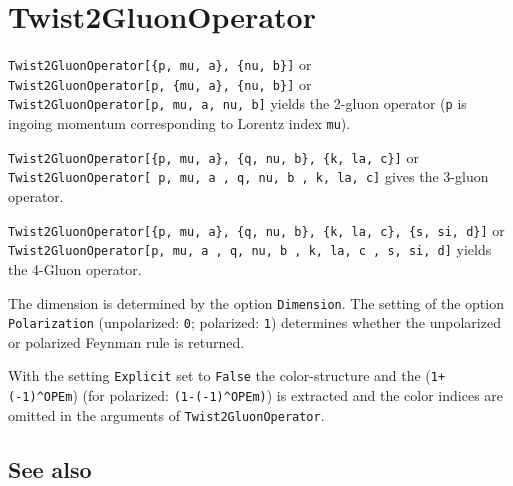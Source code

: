 \documentclass[../FeynCalcManual.tex]{subfiles}
\begin{document}
\hypertarget{twist2gluonoperator}{%
\section{Twist2GluonOperator}\label{twist2gluonoperator}}

\texttt{Twist2GluonOperator[\allowbreak{}\{\allowbreak{}p,\ \allowbreak{}mu,\ \allowbreak{}a\},\ \allowbreak{}\{\allowbreak{}nu,\ \allowbreak{}b\}]}
or
\texttt{Twist2GluonOperator[\allowbreak{}p,\ \allowbreak{}\{\allowbreak{}mu,\ \allowbreak{}a\},\ \allowbreak{}\{\allowbreak{}nu,\ \allowbreak{}b\}]}
or
\texttt{Twist2GluonOperator[\allowbreak{}p,\ \allowbreak{}mu,\ \allowbreak{}a,\ \allowbreak{}nu,\ \allowbreak{}b]}
yields the 2-gluon operator (\texttt{p} is ingoing momentum
corresponding to Lorentz index \texttt{mu}).

\texttt{Twist2GluonOperator[\allowbreak{}\{\allowbreak{}p,\ \allowbreak{}mu,\ \allowbreak{}a\},\ \allowbreak{}\{\allowbreak{}q,\ \allowbreak{}nu,\ \allowbreak{}b\},\ \allowbreak{}\{\allowbreak{}k,\ \allowbreak{}la,\ \allowbreak{}c\}]}
or
\texttt{Twist2GluonOperator[\allowbreak{} p,\ \allowbreak{}mu,\ \allowbreak{}a ,\ \allowbreak{}q,\ \allowbreak{}nu,\ \allowbreak{}b ,\ \allowbreak{}k,\ \allowbreak{}la,\ \allowbreak{}c]}
gives the 3-gluon operator.

\texttt{Twist2GluonOperator[\allowbreak{}\{\allowbreak{}p,\ \allowbreak{}mu,\ \allowbreak{}a\},\ \allowbreak{}\{\allowbreak{}q,\ \allowbreak{}nu,\ \allowbreak{}b\},\ \allowbreak{}\{\allowbreak{}k,\ \allowbreak{}la,\ \allowbreak{}c\},\ \allowbreak{}\{\allowbreak{}s,\ \allowbreak{}si,\ \allowbreak{}d\}]}
or
\texttt{Twist2GluonOperator[\allowbreak{}p,\ \allowbreak{}mu,\ \allowbreak{}a ,\ \allowbreak{}q,\ \allowbreak{}nu,\ \allowbreak{}b ,\ \allowbreak{}k,\ \allowbreak{}la,\ \allowbreak{}c ,\ \allowbreak{}s,\ \allowbreak{}si,\ \allowbreak{}d]}
yields the 4-Gluon operator.

The dimension is determined by the option \texttt{Dimension}. The
setting of the option \texttt{Polarization} (unpolarized: \texttt{0};
polarized: \texttt{1}) determines whether the unpolarized or polarized
Feynman rule is returned.

With the setting \texttt{Explicit} set to \texttt{False} the
color-structure and the (\texttt{1+(-1)^OPEm}) (for polarized:
\texttt{(1-(-1)^OPEm)}) is extracted and the color indices are omitted
in the arguments of \texttt{Twist2GluonOperator}.

\subsection{See also}
\end{document}
